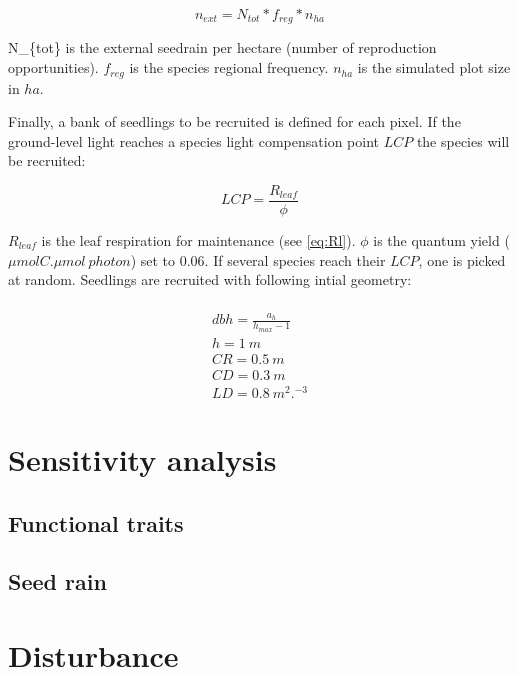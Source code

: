 \documentclass[]{article}
\theoremstyle{definition}
\theoremstyle{definition}
\theoremstyle{remark}
\begin{document}
\begin{equation}
  n_{ext} = N_{tot}*f_{reg}*n_{ha}
  \label{eq:next}
\end{equation}

N\_\{tot\} is the external seedrain per hectare (number of reproduction
opportunities). \(f_{reg}\) is the species regional frequency.
\(n_{ha}\) is the simulated plot size in \(ha\).

Finally, a bank of seedlings to be recruited is defined for each pixel.
If the ground-level light reaches a species light compensation point
\(LCP\) the species will be recruited:

\begin{equation}
  LCP = \frac{R_{leaf}}{\phi}
  \label{eq:LCP}
\end{equation}

\(R_{leaf}\) is the leaf respiration for maintenance (see \eqref{eq:Rl}).
\(\phi\) is the quantum yield (\(\mu mol C.\mu mol~photon\)) set to
0.06. If several species reach their \(LCP\), one is picked at random.
Seedlings are recruited with following intial geometry:

\begin{equation}
  \begin{array}{c} \\
    dbh = \frac{a_h}{h_{max} - 1}\\
    h = 1~m\\
    CR = 0.5~m\\
    CD = 0.3~m\\
    LD = 0.8~m^2.^{-3}
  \end{array}
  \label{eq:C}
\end{equation}

\section{Sensitivity analysis}\label{sensitivity-analysis}

\subsection{Functional traits}\label{functional-traits}

\subsection{Seed rain}\label{seed-rain}

\section{Disturbance}\label{disturbance}
\end{document}
